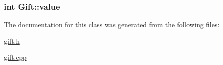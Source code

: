 \subsubsection[{\texorpdfstring{value}{value}}]{\setlength{\rightskip}{0pt plus 5cm}int Gift\+::value\hspace{0.3cm}{\ttfamily [private]}}\hypertarget{classGift_a71d14b92ebfd06993afe584f088bc748}{}\label{classGift_a71d14b92ebfd06993afe584f088bc748}


The documentation for this class was generated from the following files\+:\begin{DoxyCompactItemize}
\item 
\hyperlink{gift_8h}{gift.\+h}\item 
\hyperlink{gift_8cpp}{gift.\+cpp}\end{DoxyCompactItemize}
